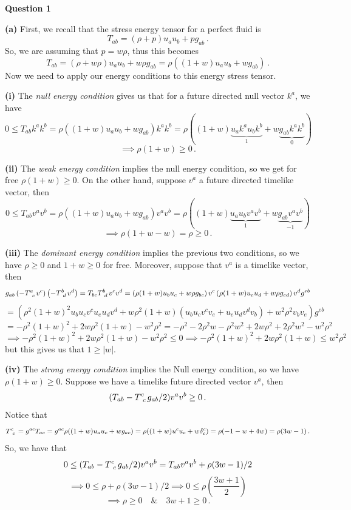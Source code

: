\documentclass[10pt]{article}
\begin{document}
\textbf{Question 1}

\textbf{(a)} First, we recall that the stress energy tensor for a perfect fluid is
\[ T_{ab} = (\rho + p)u_{a}u_{b} + pg_{ab} \, .\]
So, we are assuming that $p = w \rho$, thus this becomes
\[ T_{ab} = (\rho + w \rho)u_{a}u_{b} + w\rho g_{ab} = \rho\left((1 + w)u_{a}u_{b} + wg_{ab}\right) \, .\]
Now we need to apply our energy conditions to this energy stress tensor.

\textbf{(i)} The \textit{null energy condition} gives us that for a future directed null vector $k^{a}$, we have
\[ 0 \leq T_{ab}k^{a}k^{b} = \rho\left((1 + w)u_{a}u_{b} + wg_{ab}\right)k^{a}k^{b} = \rho\left((1+w)\underbrace{u_{a}k^{a}u_{b}k^{b}}_{1} + w\underbrace{g_{ab}k^{a}k^{b}}_{0}\right) \]
\[ \implies \rho(1+w) \geq 0 \, .\]

\textbf{(ii)} The \textit{weak energy condition} implies the null energy condition, so we get for free $\rho(1+w) \geq 0$. On the other hand, suppose $v^{a}$ a future directed timelike vector, then
\[ 0 \leq T_{ab}v^{a}v^{b} = \rho\left((1 + w)u_{a}u_{b} + wg_{ab}\right)v^{a}v^{b} = \rho\left((1 + w)\underbrace{u_{a}u_{b}v^{a}v^{b}}_{1} + w\underbrace{g_{ab}v^{a}v^{b}}_{-1}\right) \]
\[ \implies \rho(1 + w - w) = \rho \geq 0 \, .\]

\textbf{(iii)} The \textit{dominant energy condition} implies the previous two conditions, so we have $\rho \geq 0$ and $1+w \geq 0$ for free. Moreover, suppose that $v^{a}$ is a timelike vector, then
\[ g_{ab}\left(-\tensor{T}{^{a}_{c}}v^{c}\right)\left(-\tensor{T}{^{b}_{d}}v^{d}\right) = T_{bc}\tensor{T}{^{b}_{d}}v^{c}v^{d} = \left(\rho(1+w)u_{b}u_{c} + w\rho g_{bc}\right)v^{c}\left(\rho(1+w)u_{e}u_{d} + w\rho g_{ed}\right)v^{d}g^{eb}\]
\[ = \left(\rho^{2}(1+w)^{2}u_{b}u_{c}v^{c}u_{e}u_{d}v^{d} + w\rho^{2}(1+w)(u_{b}u_{c}v^{c}v_{e} + u_{e}u_{d}v^{d}v_{b}) + w^{2}\rho^{2}v_{b}v_{e}\right)g^{eb} \]
\[ = -\rho^{2}(1+w)^{2} + 2w\rho^{2}(1 +w) - w^{2}\rho^{2} = -\rho^{2} - 2\rho^{2}w - \rho^{2}w^{2} + 2w\rho^{2} + 2\rho^{2}w^{2} - w^{2}\rho^{2}\]
\[ \implies -\rho^{2}(1+w)^{2} + 2w\rho^{2}(1+w) -w^{2}\rho^{2} \leq 0 \implies -\rho^{2}(1+w)^{2} + 2w\rho^{2}(1+w) \leq w^{2}\rho^{2}\]
but this gives us that $1 \geq |w|$.

\textbf{(iv)} The \textit{strong energy condition} implies the Null energy condition, so we have $\rho(1 + w) \geq 0$. Suppose we have a timelike future directed vector $v^{a}$, then
\[ (T_{ab} - \tensor{T}{^{c}_{c}}g_{ab}/2)v^{a}v^{b} \geq 0 \, .\]
Notice that
\[ \tensor{T}{^{c}_{c}} = g^{ac}T_{ac} = g^{ac}\rho((1+w)u_{a}u_{c} + wg_{ac}) = \rho((1+w)u^{c}u_{c}+w\delta^{c}_{c})= \rho(-1-w + 4w) = \rho(3w-1) \, .\]
So, we have that
\[ 0 \leq (T_{ab} - \tensor{T}{^{c}_{c}}g_{ab}/2)v^{a}v^{b} = T_{ab}v^{a}v^{b} + \rho(3w-1)/2 \]
\[ \implies 0 \leq \rho + \rho(3w-1)/2 \implies 0 \leq \rho\left(\frac{3w + 1}{2}\right) \]
\[ \implies \rho \geq 0 \quad \& \quad 3w + 1 \geq 0 \, .\]
\end{document}

